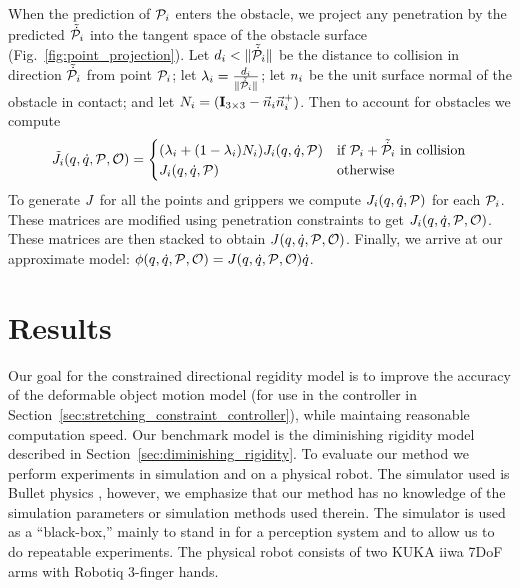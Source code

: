When the prediction of $\mathcal{P}_i$ enters the obstacle, we project any penetration by the predicted $\tilde{\dot{\mathcal{P}}}_i$ into the tangent space of the obstacle surface (Fig.~\ref{fig:point_projection}). Let $d_i < \| \tilde{\dot{\mathcal{P}}}_i \|$ be the distance to collision in direction $\tilde{\dot{\mathcal{P}}}_i$ from point $\mathcal{P}_i$; let $\lambda_i = \frac{d_i}{\| \tilde{\dot{\mathcal{P}}}_i \|}$; let $n_i$ be the unit surface normal of the obstacle in contact; and let $N_i = (\mathbf{I}_{3\times 3} - \vec{n}_i \vec{n}_i^+)$. Then to account for obstacles we compute
\begin{equation}
    \tilde {J}_i(q, \dot{q}, \mathcal{P}, \mathcal{O}) =
    \begin{cases}
        (\lambda_i + (1 - \lambda_i)N_i) J_i(q, \dot{q}, \mathcal{P}) & \text{if $\mathcal{P}_i + \tilde{\dot{\mathcal{P}}}_i$ in collision} \\
        J_i(q, \dot{q}, \mathcal{P}) & \text{otherwise}
    \end{cases}
\end{equation}
To generate $J$ for all the points and grippers we compute $J_i(q, \dot{q}, \mathcal{P})$ for each $\mathcal{P}_i$. These matrices are modified using penetration constraints to get $J_i(q, \dot{q}, \mathcal{P}, \mathcal{O})$. These matrices are then stacked to obtain $J(q, \dot{q}, \mathcal{P}, \mathcal{O})$. Finally, we arrive at our approximate model: $\phi(q, \dot{q}, \mathcal{P}, \mathcal{O}) = J(q, \dot{q}, \mathcal{P}, \mathcal{O}) \dot{q}$.


\section{Results}
\label{sec:modelling_results}

Our goal for the constrained directional regidity model is to improve the accuracy of the deformable object motion model (for use in the controller in Section~\ref{sec:stretching_constraint_controller}), while maintaing reasonable computation speed. Our benchmark model is the diminishing rigidity model described in Section~\ref{sec:diminishing_rigidity}. To evaluate our method we perform experiments in simulation and on a physical robot. The simulator used is Bullet physics \cite{Coumans2010}, however, we emphasize that our method has no knowledge of the simulation parameters or simulation methods used therein. The simulator is used as a ``black-box,'' mainly to stand in for a perception system and to allow us to do repeatable experiments. The physical robot consists of two KUKA iiwa 7DoF arms with Robotiq 3-finger hands.

